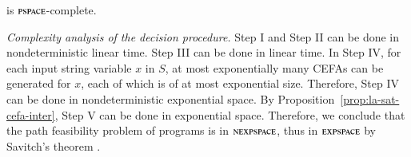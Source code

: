 \begin{proposition}\label{prop:la-sat-cefa-inter}
{\lasat} is $\textsc{pspace}$-complete.
\end{proposition}


\smallskip
\noindent\emph{Complexity analysis of the decision procedure.} Step I and Step II can be done in nondeterministic linear time. Step III can be done in linear time. In Step IV, for each input string variable $x$ in $S$, at most exponentially many CEFAs can be generated for $x$, each of which is of at most exponential size. Therefore, Step IV can be done in nondeterministic exponential space. By Proposition~\ref{prop:la-sat-cefa-inter}, Step V can be done in exponential space. Therefore, we conclude that the path feasibility problem of {\slint} programs is in $\textsc{nexpspace}$, thus in $\textsc{expspace}$ by Savitch's theorem \cite{complexity-book}.  
 
